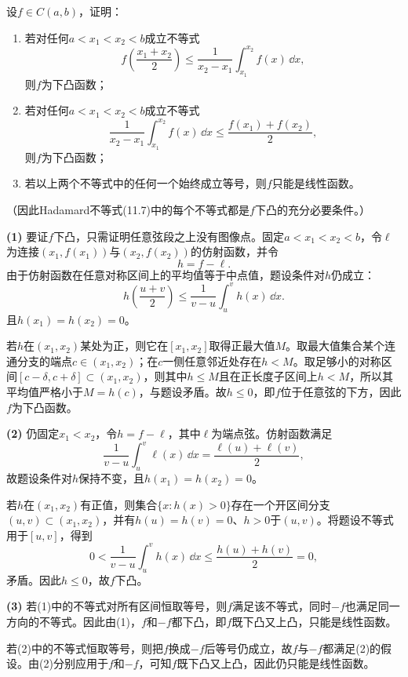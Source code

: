 \begin{xreferenceproblem}[7]
设$f\in C(a,b)$，证明：
  \begin{enumerate}[label=(\arabic*)]
    \item 若对任何$a<x_1<x_2<b$成立不等式
    \[
      f\left(\frac{x_1+x_2}{2}\right)
      \le\frac1{x_2-x_1}\int_{x_1}^{x_2}f(x)\,\dd x,
    \]
    则$f$为下凸函数；
    \item 若对任何$a<x_1<x_2<b$成立不等式
    \[
      \frac1{x_2-x_1}\int_{x_1}^{x_2}f(x)\,\dd x
      \le\frac{f(x_1)+f(x_2)}2,
    \]
    则$f$为下凸函数；
    \item 若以上两个不等式中的任何一个始终成立等号，则$f$只能是线性函数。
  \end{enumerate}
  （因此Hadamard不等式(11.7)中的每个不等式都是$f$下凸的充分必要条件。）
\end{xreferenceproblem}
\begin{xsolution}
\textbf{(1)}\quad
要证$f$下凸，只需证明任意弦段之上没有图像点。固定$a<x_1<x_2<b$，令$\ell$为连接$(x_1,f(x_1))$与$(x_2,f(x_2))$的仿射函数，并令
\[
 h=f-\ell.
\]
由于仿射函数在任意对称区间上的平均值等于中点值，题设条件对$h$仍成立：
\[
 h\left(\frac{u+v}{2}\right)
 \le\frac1{v-u}\int_u^vh(x)\,\dd x.
\]
且$h(x_1)=h(x_2)=0$。

若$h$在$(x_1,x_2)$某处为正，则它在$[x_1,x_2]$取得正最大值$M$。取最大值集合某个连通分支的端点$c\in(x_1,x_2)$；在$c$一侧任意邻近处存在$h<M$。取足够小的对称区间$[c-\delta,c+\delta]\subset(x_1,x_2)$，则其中$h\le M$且在正长度子区间上$h<M$，所以其平均值严格小于$M=h(c)$，与题设矛盾。故$h\le0$，即$f$位于任意弦的下方，因此$f$为下凸函数。

\textbf{(2)}\quad
仍固定$x_1<x_2$，令$h=f-\ell$，其中$\ell$为端点弦。仿射函数满足
\[
 \frac1{v-u}\int_u^v\ell(x)\,\dd x=\frac{\ell(u)+\ell(v)}2,
\]
故题设条件对$h$保持不变，且$h(x_1)=h(x_2)=0$。

若$h$在$(x_1,x_2)$有正值，则集合$\{x:h(x)>0\}$存在一个开区间分支$(u,v)\subset(x_1,x_2)$，并有$h(u)=h(v)=0$、$h>0$于$(u,v)$。将题设不等式用于$[u,v]$，得到
\[
 0<\frac1{v-u}\int_u^vh(x)\,\dd x
 \le\frac{h(u)+h(v)}2=0,
\]
矛盾。因此$h\le0$，故$f$下凸。

\textbf{(3)}\quad
若(1)中的不等式对所有区间恒取等号，则$f$满足该不等式，同时$-f$也满足同一方向的不等式。因此由(1)，$f$和$-f$都下凸，即$f$既下凸又上凸，只能是线性函数。

若(2)中的不等式恒取等号，则把$f$换成$-f$后等号仍成立，故$f$与$-f$都满足(2)的假设。由(2)分别应用于$f$和$-f$，可知$f$既下凸又上凸，因此仍只能是线性函数。
\end{xsolution}


